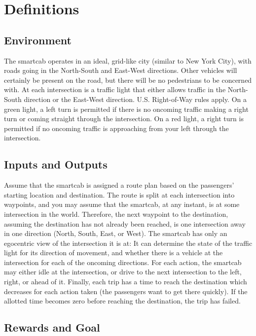 \documentclass[11pt]{article}
\begin{document}
\section{Definitions}

\subsection{Environment}

The smartcab operates in an ideal, grid-like city (similar to New York City), with roads going in the North-South and East-West directions. Other vehicles will certainly be present on the road, but there will be no pedestrians to be concerned with. At each intersection is a traffic light that either allows traffic in the North-South direction or the East-West direction. U.S. Right-of-Way rules apply. On a green light, a left turn is permitted if there is no oncoming traffic making a right turn or coming straight through the intersection. On a red light, a right turn is permitted if no oncoming traffic is approaching from your left through the intersection. 

\subsection{Inputs and Outputs}

Assume that the smartcab is assigned a route plan based on the passengers’ starting location and destination. The route is split at each intersection into waypoints, and you may assume that the smartcab, at any instant, is at some intersection in the world. Therefore, the next waypoint to the destination, assuming the destination has not already been reached, is one intersection away in one direction (North, South, East, or West). The smartcab has only an egocentric view of the intersection it is at: It can determine the state of the traffic light for its direction of movement, and whether there is a vehicle at the intersection for each of the oncoming directions. For each action, the smartcab may either idle at the intersection, or drive to the next intersection to the left, right, or ahead of it. Finally, each trip has a time to reach the destination which decreases for each action taken (the passengers want to get there quickly). If the allotted time becomes zero before reaching the destination, the trip has failed.

\subsection{Rewards and Goal}
\end{document}
